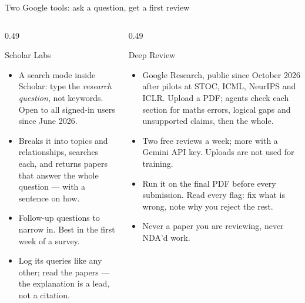 \documentclass[aspectratio=169,11pt]{beamer}
\begin{document}
\begin{frame}{Two Google tools: ask a question, get a first review}
\begin{columns}[T]
\begin{column}{0.49\textwidth}
\begin{block}{Scholar Labs \quad\footnotesize{}}
\footnotesize
\begin{itemize}
  \item A search mode inside Scholar: type the \emph{research question}, not
        keywords. Open to all signed-in users since June 2026.
  \item Breaks it into topics and relationships, searches each, and returns
        papers that answer the whole question --- with a sentence on how.
  \item Follow-up questions to narrow in. Best in the first week of a survey.
  \item Log its queries like any other; read the papers --- the explanation
        is a lead, not a citation.
\end{itemize}
\end{block}
\end{column}
\begin{column}{0.49\textwidth}
\begin{block}{Deep Review \quad\footnotesize{}}
\footnotesize
\begin{itemize}
  \item Google Research, public since October 2026 after pilots at STOC, ICML,
        NeurIPS and ICLR. Upload a PDF; agents check each section for maths
        errors, logical gaps and unsupported claims, then the whole.
  \item Two free reviews a week; more with a Gemini API key. Uploads are not
        used for training.
  \item Run it on the final PDF before every submission. Read every flag: fix
        what is wrong, note why you reject the rest.
  \item {} Never a paper you are reviewing, never
        NDA'd work.
\end{itemize}
\end{block}
\end{column}
\end{columns}
\end{frame}

\end{document}
